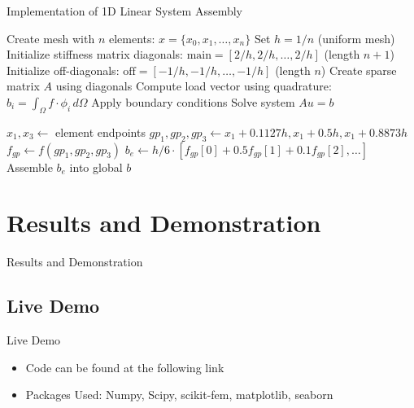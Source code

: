 \documentclass{beamer}
\begin{document}
\begin{frame}{Implementation of 1D Linear System Assembly}
\begin{algorithm}[H]
\caption{Efficient Assembly for 1D Linear Elements}
\begin{algorithmic}[1]
\State Create mesh with $n$ elements: $x = \{x_0, x_1, \ldots, x_n\}$
\State Set $h = 1/n$ (uniform mesh)
\State Initialize stiffness matrix diagonals: 
      $\text{main} = [2/h, 2/h, \ldots, 2/h]$ (length $n+1$)
\State Initialize off-diagonals: 
      $\text{off} = [-1/h, -1/h, \ldots, -1/h]$ (length $n$)
\State Create sparse matrix $A$ using diagonals
\State Compute load vector using quadrature:
      $b_i = \int_\Omega f \cdot \phi_i \, d\Omega$
\State Apply boundary conditions
\State Solve system $Au = b$
\end{algorithmic}
\end{algorithm}


\end{frame}
\begin{frame}{}
\begin{algorithm}[H]
\caption{Quadrature for Load Vector (Quadratic Elements)}
\begin{algorithmic}[1]
    \State $x_1, x_3 \gets$ element endpoints
    \State $gp_1, gp_2, gp_3 \gets x_1 + 0.1127h, x_1 + 0.5h, x_1 + 0.8873h$ 
    \State $f_{gp} \gets f(gp_1, gp_2, gp_3)$ 
    \State $b_e \gets h/6 \cdot [f_{gp}[0] + 0.5f_{gp}[1] + 0.1f_{gp}[2], \ldots]$ 
    \State Assemble $b_e$ into global $b$
\EndFor
\end{algorithmic}
\end{algorithm}
    
\end{frame}

\section{Results and Demonstration}

\begin{frame}{Results and Demonstration}
    
\end{frame}
\subsection{Live Demo}
\begin{frame}{Live Demo}
    \begin{itemize}
        \item Code can be found at the following link
        \item Packages Used: Numpy, Scipy, scikit-fem, matplotlib, seaborn
    \end{itemize}
    
\end{frame}
\end{document}
